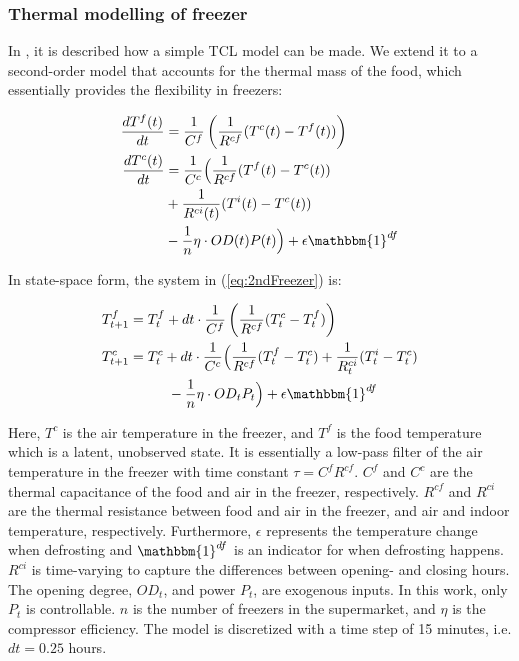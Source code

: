 \subsubsection{Thermal modelling of freezer}

In \cite{hao2014aggregate}, it is described how a simple TCL model can be made. We extend it to a second-order model that accounts for the thermal mass of the food, which essentially provides the flexibility in freezers:

\begin{subequations}\label{eq:2ndFreezer}
    \begin{align}
        \frac{dT^f(t)}{dt} & = \frac{1}{C^f}\left(\frac{1}{R^{cf}} (T^c(t) - T^f(t)) \right) \\
        \frac{dT^c(t)}{dt} & = \frac{1}{C^c}\Bigl(\frac{1}{R^{cf}} (T^f(t) - T^c(t)) \notag  \\ & + \frac{1}{R^{ci}(t)} (T^i(t) - T^c(t))                                        \notag  \\ &  -  \frac{1}{n} \eta \cdot OD(t) P(t) \Bigr) + \epsilon \mathbbm{1}^{df}
    \end{align}
\end{subequations}

In state-space form, the system in (\ref{eq:2ndFreezer}) is:

\begin{subequations}\label{eq:2ndFreezerStateSpace}
    \begin{align}
        T^{f}_{t+1} & = T^{f}_{t} + dt \cdot \frac{1}{C^f}\left(\frac{1}{R^{cf}} (T^{c}_{t} - T^{f}_{t}) \right)                                                                              \\
        T^{c}_{t+1} & = T^{c}_t + dt \cdot \frac{1}{C^c}\Bigl(\frac{1}{R^{cf}} (T^{f}_t - T^{c}_t) + \frac{1}{R^{ci}_{t}} (T^{i}_t - T^{c}_t)                                          \notag \\ & \mspace{50mu} - \frac{1}{n} \eta \cdot OD_t P_t \Bigr) + \epsilon \mathbbm{1}^{df}
    \end{align}
\end{subequations}


Here, $T^c$ is the air temperature in the freezer, and $T^f$ is the food temperature which is a latent, unobserved state. It is essentially a low-pass filter of the air temperature in the freezer with time constant $\tau = C^f R^{cf}$. $C^f$ and $C^c$ are the thermal capacitance of the food and air in the freezer, respectively. $R^{cf}$ and $R^{ci}$ are the thermal resistance between food and air in the freezer, and air and indoor temperature, respectively. Furthermore, $\epsilon$ represents the temperature change when defrosting and $\mathbbm{1}^{df}$ is an indicator for when defrosting happens. $R^{ci}$ is time-varying to capture the differences between opening- and closing hours. The opening degree, $OD_t$, and power $P_t$, are exogenous inputs. In this work, only $P_t$ is controllable. $n$ is the number of freezers in the supermarket, and $\eta$ is the compressor efficiency. The model is discretized with a time step of 15 minutes, i.e. $dt = 0.25$ hours.

